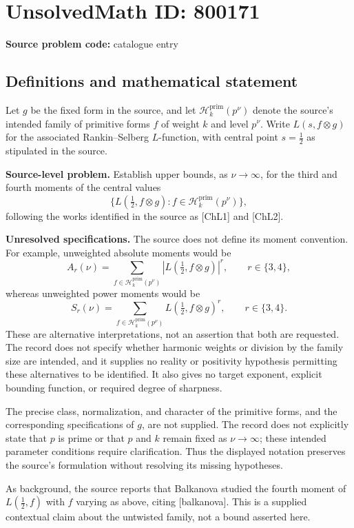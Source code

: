 \documentclass[11pt]{article}
\begin{document}
\section*{UnsolvedMath ID: 800171}
\textbf{Source problem code:} catalogue entry
\subsection{Definitions and mathematical statement}
Let \(g\) be the fixed form in the source, and let \(\mathcal H_k^{\mathrm{prim}}(p^\nu)\) denote the source's intended family of primitive forms \(f\) of weight \(k\) and level \(p^\nu\). Write \(L(s,f\otimes g)\) for the associated Rankin--Selberg \(L\)-function, with central point \(s=\tfrac12\) as stipulated in the source.

\textbf{Source-level problem.} Establish upper bounds, as \(\nu\to\infty\), for the third and fourth moments of the central values
\[
\bigl\{L(\tfrac12,f\otimes g):f\in\mathcal H_k^{\mathrm{prim}}(p^\nu)\bigr\},
\]
following the works identified in the source as [ChL1] and [ChL2].

\textbf{Unresolved specifications.} The source does not define its moment convention. For example, unweighted absolute moments would be
\[
A_r(\nu)=\sum_{f\in\mathcal H_k^{\mathrm{prim}}(p^\nu)}\left|L(\tfrac12,f\otimes g)\right|^r,
\qquad r\in\{3,4\},
\]
whereas unweighted power moments would be
\[
S_r(\nu)=\sum_{f\in\mathcal H_k^{\mathrm{prim}}(p^\nu)}L(\tfrac12,f\otimes g)^r,
\qquad r\in\{3,4\}.
\]
These are alternative interpretations, not an assertion that both are requested. The record does not specify whether harmonic weights or division by the family size are intended, and it supplies no reality or positivity hypothesis permitting these alternatives to be identified. It also gives no target exponent, explicit bounding function, or required degree of sharpness.

The precise class, normalization, and character of the primitive forms, and the corresponding specifications of \(g\), are not supplied. The record does not explicitly state that \(p\) is prime or that \(p\) and \(k\) remain fixed as \(\nu\to\infty\); these intended parameter conditions require clarification. Thus the displayed notation preserves the source's formulation without resolving its missing hypotheses.

As background, the source reports that Balkanova studied the fourth moment of \(L(\tfrac12,f)\) with \(f\) varying as above, citing [balkanova]. This is a supplied contextual claim about the untwisted family, not a bound asserted here.
\end{document}
